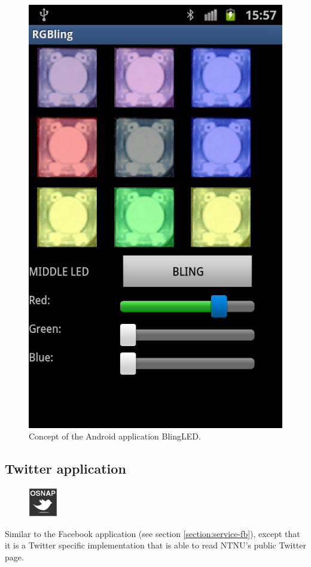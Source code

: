 \begin{figure}[h!]
	\begin{center}
	\includegraphics[scale=0.35]{img/prototype3rgBling.png}
	\end{center}
	\caption{Concept of the Android application BlingLED.}
	\label{fig:design-ledmatrix}
\end{figure}

\subsection{Twitter application}
\begin{figure}
	\centering \includegraphics[scale=1]{img/app-twitter}
\end{figure}
Similar to the Facebook application (see section \ref{section:service-fb}),
except that it is a Twitter specific implementation that is able to read NTNU's public Twitter page.

